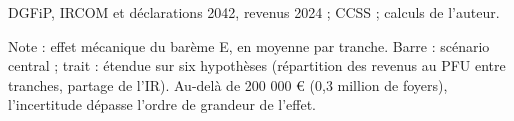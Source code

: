 DGFiP, IRCOM et déclarations 2042, revenus 2024 ; CCSS ; calculs de l'auteur.\par Note : effet mécanique du barème E, en moyenne par tranche. Barre : scénario central ; trait : étendue sur six hypothèses (répartition des revenus au PFU entre tranches, partage de l'IR). Au-delà de 200 000 \euro{} (0,3 million de foyers), l'incertitude dépasse l'ordre de grandeur de l'effet.
